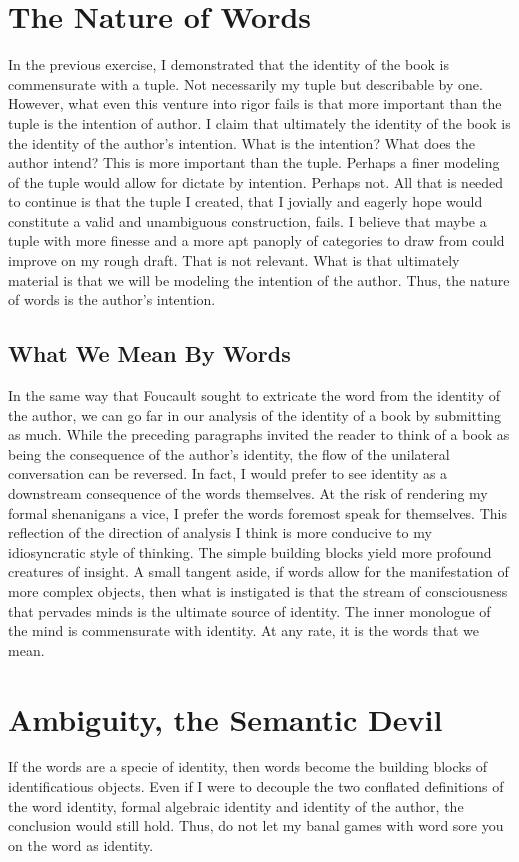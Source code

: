 \documentclass[12pt]{article}
\begin{document}
\section{The Nature of Words}
In the previous exercise, I demonstrated that the identity of the book is
commensurate with a tuple. Not necessarily my tuple but describable by one.
However, what even this venture into rigor fails is that more important than the
tuple is the intention of author. I claim that ultimately the identity of the
book is the identity of the author's intention. What is the intention? What does
the author intend? This is more important than the tuple. Perhaps a finer
modeling of the tuple would allow for dictate by intention. Perhaps not. All
that is needed to continue is that the tuple I created, that I jovially and
eagerly hope would constitute a valid and unambiguous construction, fails. I
believe that maybe a tuple with more finesse and a more apt panoply of
categories to draw from could improve on my rough draft. That is not relevant.
What is that ultimately material is that we will be modeling the intention of
the author. Thus, the nature of words is the author's intention.

\subsection{What We Mean By Words}
In the same way that Foucault sought to extricate the word from the identity of
the author, we can go far in our analysis of the identity of a book by
submitting as much. While the preceding paragraphs invited the reader to think
of a book as being the consequence of the author's identity, the flow of the
unilateral conversation can be reversed. In fact, I would prefer to see identity
as a downstream consequence of the words themselves. At the risk of rendering my
formal shenanigans a vice, I prefer the words foremost speak for themselves.
This reflection of the direction of analysis I think is more conducive to my
idiosyncratic style of thinking. The simple building blocks yield more profound
creatures of insight. A small tangent aside, if words allow for the
manifestation of more complex objects, then what is instigated is that the
stream of consciousness that pervades minds is the ultimate source of identity.
The inner monologue of the mind is commensurate with identity. At any rate, it is
the words that we mean.

\section{Ambiguity, the Semantic Devil}
If the words are a specie of identity, then words become the building blocks of
identificatious objects. Even if I were to decouple the two conflated
definitions of the word identity, formal algebraic identity and identity of the
author, the conclusion would still hold. Thus, do not let my banal games with
word sore you on the word as identity.
\end{document}
